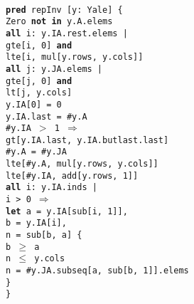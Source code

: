 \documentclass[11pt,conference]{IEEEtran}
\newenvironment{myquote}{\list{}{\leftmargin=12pt\rightmargin=0pt}\item[]}{\endlist}
\def\TA{\makebox[12pt]{}}
\def\TB{\makebox[24pt]{}}
\def\TC{\makebox[36pt]{}}
\def\TD{\makebox[48pt]{}}
\def\Bpred{\textbf{pred} }
\def\Ball{\textbf{all} }
\def\Bin{\textbf{in} }
\def\Band{\textbf{and} }
\def\Bnot{\textbf{not} }
\def\Bimplies{$\Rightarrow$ }
\def\Blet{\textbf{let} }
\begin{document}
\begin{figure}
\centering
\begin{myquote}\small{\texttt{\\
\Bpred repInv [y: Yale] \{\\
\TA Zero \Bnot \Bin y.A.elems\\
\TA \Ball i: y.IA.rest.elems |\\
\TB gte[i, 0] \Band\\
\TB lte[i, mul[y.rows, y.cols]]\\
\TA \Ball j: y.JA.elems |\\
\TB gte[j, 0] \Band\\
\TB lt[j, y.cols]\\
\TA y.IA[0] = 0\\
\TA y.IA.last = \#y.A\\
\TA \#y.IA $>$ 1 \Bimplies\\
\TC gt[y.IA.last, y.IA.butlast.last]\\
\TA \#y.A = \#y.JA\\
\TA lte[\#y.A, mul[y.rows, y.cols]]\\
\TA lte[\#y.IA, add[y.rows, 1]]\\
\TA \Ball i: y.IA.inds |\\
\TB i > 0 \Bimplies\\
\TC \Blet a = y.IA[sub[i, 1]],\\
\TC       b = y.IA[i],\\
\TC       n = sub[b, a] \{\\
\TD   b $\geq$ a\\
\TD   n $\leq$ y.cols\\
\TD   n = \#y.JA.subseq[a, sub[b, 1]].elems\\
\TC \}\\
\}
}}
\end{myquote}
\end{figure}




\end{document}
